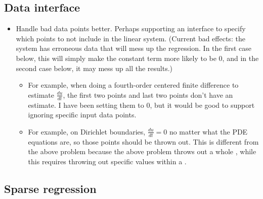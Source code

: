 \documentclass{article}
\def\lstinline#1{}%
\begin{document}
\subsection{Data interface}
\begin{itemize}
    \item Handle bad data points better. Perhaps supporting an interface to
      specify which points to not include in the linear system. (Current bad
      effects: the system has erroneous data that will mess up the regression.
      In the first case below, this will simply make the constant term more
      likely to be 0, and in the second case below, it may mess up all the
      results.)
    \begin{itemize}
        \item For example, when doing a fourth-order centered finite difference
          to estimate $\frac{du}{dt}$, the first two points and last two points
          don't have an estimate. I have been setting them to 0, but it would be
          good to support ignoring specific input data points.
        \item For example, on Dirichlet boundaries, $\frac{du}{dt} = 0$ no
          matter what the PDE equations are, so those points should be thrown
          out. This is different from the above problem because the above
          problem throws out a whole \lstinline{Vec}, while this requires
          throwing out specific values within a \lstinline{Vec}.
    \end{itemize}
\end{itemize}

\subsection{Sparse regression}
\end{document}
